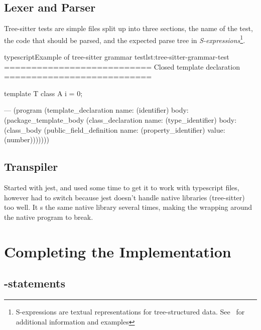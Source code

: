 \subsection{Lexer and Parser}\label{subsec:testing-lexer-and-parser}

Tree-sitter tests are simple  files split up into three sections, the name of the test, the code that should be parsed, and the expected parse tree in \textit{S-expressions}\footnote{S-expressions are textual representations for tree-structured data. See~\cite{sexprs} for additional information and examples}.

\begin{code}{typescript}{Example of tree-sitter grammar test}{lst:tree-sitter-grammar-test}
    ===========================
    Closed template declaration
    ===========================

    template T {
        class A {
            i = 0;
        }
    }

    ---
    (program
        (template_declaration
            name: (identifier)
            body: (package_template_body
                    (class_declaration
                        name: (type_identifier)
                        body: (class_body
                            (public_field_definition
                                name: (property_identifier)
                                value: (number)))))))

\end{code}

\subsection{Transpiler}\label{subsec:testing-transpiler}

Started with jest, and used some time to get it to work with typescript files, however had to switch because jest doesn't handle native libraries (tree-sitter) too well.
It s the same native library several times, making the wrapping around the native program to break.


\section{Completing the Implementation}\label{sec:completing-the-implementation}

\subsection{-statements}\label{subsec:addto-statements}

